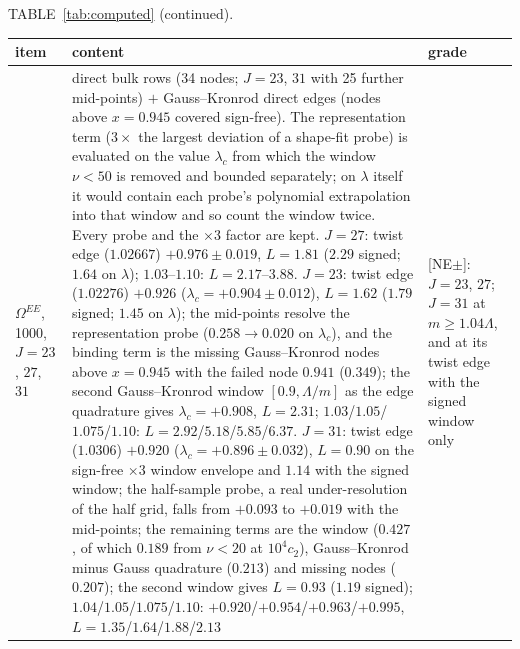 \documentclass[aps,prl,onecolumn,superscriptaddress,nofootinbib]{revtex4-2}
\begin{document}
\begin{table}[!htbp]
\footnotesize
\centering TABLE~\ref{tab:computed} (continued).\par\smallskip
\begin{ruledtabular}
\begin{tabular}{L{3.0cm}L{10.8cm}L{2.4cm}}
item & content & grade\\\hline
$\Omega^{EE}$, 1000, $J=23$, $27$, $31$ & direct bulk rows (34 nodes; $J=23$, $31$ with 25 further mid-points) $+$ Gauss--Kronrod direct edges (nodes above $x=0.945$ covered sign-free). The representation term ($3\times$ the largest deviation of a shape-fit probe) is evaluated on the value $\lambda_c$ from which the window $\nu<50$ is removed and bounded separately; on $\lambda$ itself it would contain each probe's polynomial extrapolation into that window and so count the window twice. Every probe and the $\times3$ factor are kept. $J=27$: twist edge ($1.02667$) $+0.976\pm0.019$, $L=1.81$ ($2.29$ signed; $1.64$ on $\lambda$); $1.03$--$1.10$: $L=2.17$--$3.88$. $J=23$: twist edge ($1.02276$) $+0.926$ ($\lambda_c=+0.904\pm0.012$), $L=1.62$ ($1.79$ signed; $1.45$ on $\lambda$); the mid-points resolve the representation probe ($0.258\to0.020$ on $\lambda_c$), and the binding term is the missing Gauss--Kronrod nodes above $x=0.945$ with the failed node $0.941$ ($0.349$); the second Gauss--Kronrod window $[0.9,\Lambda/m]$ as the edge quadrature gives $\lambda_c=+0.908$, $L=2.31$; $1.03$/$1.05$/$1.075$/$1.10$: $L=2.92$/$5.18$/$5.85$/$6.37$. $J=31$: twist edge ($1.0306$) $+0.920$ ($\lambda_c=+0.896\pm0.032$), $L=0.90$ on the sign-free $\times3$ window envelope and $1.14$ with the signed window; the half-sample probe, a real under-resolution of the half grid, falls from $+0.093$ to $+0.019$ with the mid-points; the remaining terms are the window ($0.427$, of which $0.189$ from $\nu<20$ at $10^4c_2$), Gauss--Kronrod minus Gauss quadrature ($0.213$) and missing nodes ($0.207$); the second window gives $L=0.93$ ($1.19$ signed); $1.04$/$1.05$/$1.075$/$1.10$: $+0.920$/$+0.954$/$+0.963$/$+0.995$, $L=1.35$/$1.64$/$1.88$/$2.13$ & [NE$\pm$]: $J=23$, $27$; $J=31$ at $m\ge1.04\Lambda$, and at its twist edge with the signed window only\\

\end{tabular}
\end{ruledtabular}
\end{table}
\end{document}
